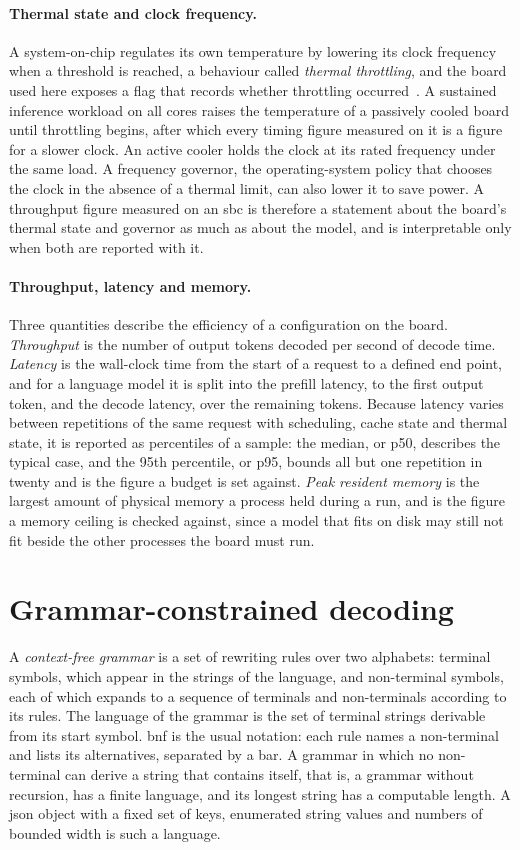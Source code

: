 \paragraph{Thermal state and clock frequency.} A system-on-chip regulates its own temperature by
lowering its clock frequency when a threshold is reached, a behaviour called \emph{thermal
throttling}, and the board used here exposes a flag that records whether throttling
occurred~\cite{rpiosdocs}. A sustained inference
workload on all cores raises the temperature of a passively cooled board until throttling begins,
after which every timing figure measured on it is a figure for a slower clock. An active cooler
holds the clock at its rated frequency under the same load. A frequency governor, the
operating-system policy that chooses the clock in the absence of a thermal limit, can also lower
it to save power. A throughput figure measured on an \gls{sbc} is therefore a statement about the
board's thermal state and governor as much as about the model, and is interpretable only when
both are reported with it.

\paragraph{Throughput, latency and memory.} Three quantities describe the efficiency of a
configuration on the board. \emph{Throughput} is the number of output tokens decoded per second of
decode time. \emph{Latency} is the wall-clock time from the start of a request to a defined end
point, and for a language model it is split into the prefill latency, to the first output token,
and the decode latency, over the remaining tokens. Because latency varies between repetitions of
the same request with scheduling, cache state and thermal state, it is reported as percentiles of
a sample: the median, or p50, describes the typical case, and the 95th percentile, or p95,
bounds all but one repetition in twenty and is the figure a budget is set against. \emph{Peak
resident memory} is the largest amount of physical memory a process held during a run, and is the
figure a memory ceiling is checked against, since a model that fits on disk may still not fit
beside the other processes the board must run.

\clearpage
\section{Grammar-constrained decoding}
\label{sec:bg-gbnf}

A \emph{context-free grammar} is a set of rewriting rules over two alphabets: terminal symbols,
which appear in the strings of the language, and non-terminal symbols, each of which expands to a
sequence of terminals and non-terminals according to its rules. The language of the grammar is
the set of terminal strings derivable from its start symbol. \Gls{bnf} is the usual notation:
each rule names a non-terminal and lists its alternatives, separated by a bar. A grammar in which
no non-terminal can derive a string that contains itself, that is, a grammar without recursion,
has a finite language, and its longest string has a computable length. A \gls{json} object with a fixed set of
keys, enumerated string values and numbers of bounded width is such a language.

